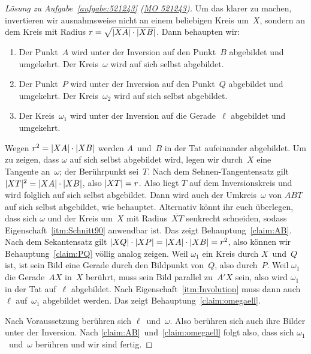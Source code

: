 \begin{proof}[Lösung zu Aufgabe~\ref{aufgabe:521243} \textmd{(\href{https://www.mathematik-olympiaden.de/moev/index.php?option=com_download&thema=a&format=raw&datei=A52124a.pdf}{MO 521243})}]
	Um das klarer zu machen, invertieren wir ausnahmsweise nicht an einem beliebigen Kreis um~$X$, sondern an dem Kreis mit Radius $r=\sqrt{\lvert XA\rvert\cdot\lvert XB\rvert}$. Dann behaupten wir:
	\begin{enumerate}[label={$(\arabic*)$},ref={$(\arabic*)$}]\itshape
		\item \label{claim:AB}
		Der Punkt~$A$ wird unter der Inversion auf den Punkt~$B$ abgebildet und umgekehrt. Der Kreis~$\omega$ wird auf sich selbst abgebildet.
		\item \label{claim:PQ}
		Der Punkt~$P$ wird unter der Inversion auf den Punkt~$Q$ abgebildet und umgekehrt. Der Kreis~$\omega_2$ wird auf sich selbst abgebildet.
		\item \label{claim:omegaell}
		Der Kreis~$\omega_1$ wird unter der Inversion auf die Gerade~$\ell$ abgebildet und umgekehrt.
	\end{enumerate}
	Wegen $r^2=\lvert XA\rvert\cdot\lvert XB\rvert$ werden $A$~und~$B$ in der Tat aufeinander abgebildet. Um zu zeigen, dass $\omega$ auf sich selbst abgebildet wird, legen wir durch~$X$ eine Tangente an~$\omega$; der Berührpunkt sei~$T$. Nach dem Sehnen-Tangentensatz gilt $\lvert XT\rvert^2=\lvert XA\rvert\cdot\lvert XB\rvert$, also $\lvert XT\rvert=r$.
	Also liegt $T$ auf dem Inversionskreis und wird folglich auf sich selbst abgebildet. Dann wird auch der Umkreis~$\omega$ von $ABT$ auf sich selbst abgebildet, wie behauptet. Alternativ könnt ihr euch überlegen, dass sich $\omega$ und der Kreis um~$X$ mit Radius~$\overline{XT}$ senkrecht schneiden, sodass Eigenschaft~\ref{itm:Schnitt90} anwendbar ist. Das zeigt Behauptung~\ref{claim:AB}. Nach dem Sekantensatz gilt $\lvert XQ\rvert\cdot \lvert XP\rvert=\lvert XA\rvert\cdot\lvert XB\rvert=r^2$, also können wir Behauptung~\ref{claim:PQ} völlig analog zeigen. Weil $\omega_1$ ein Kreis durch $X$~und~$Q$ ist, ist sein Bild eine Gerade durch den Bildpunkt von~$Q$, also durch~$P$. Weil $\omega_1$ die Gerade~$AX$ in~$X$ berührt, muss sein Bild parallel zu~$A'X$ sein, also wird $\omega_1$ in der Tat auf~$\ell$ abgebildet. Nach Eigenschaft~\ref{itm:Involution} muss dann auch~$\ell$ auf~$\omega_1$ abgebildet werden. Das zeigt Behauptung~\ref{claim:omegaell}.
	
	Nach Voraussetzung berühren sich $\ell$~und~$\omega$. Also berühren sich auch ihre Bilder unter der Inversion. Nach \ref{claim:AB}~und~\ref{claim:omegaell} folgt also, dass sich $\omega_1$~und~$\omega$ berühren und wir sind fertig.
\end{proof}

